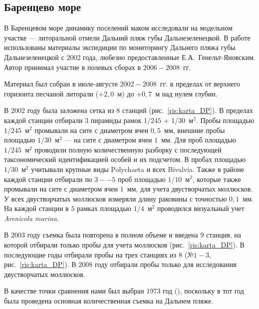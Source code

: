         \subsection{Баренцево море}

В Баренцевом море динамику поселений маком исследовали на модельном участке --- литоральной отмели Дальний пляж губы Дальнезеленецкой. 
В работе использованы материалы экспедиции по мониторингу Дальнего пляжа губы Дальнезеленецкой с $2002$ года, любезно предоставленные Е.\:А.~Генельт-Яновским.
Автор принимал участие в полевых сборах в $2006 - 2008$~гг.

Материал был собран в июле-августе $2002 - 2008$~гг. в пределах от верхнего горизонта песчаной литорали ($+2,0$~м) до $+0,7$~м над нулем глубин. 

 В $2002$ году была заложена сетка из $8$ станций (рис.~\ref{ris:karta_DP}). 
 В пределах каждой станции отбирали $3$ пирамиды рамок $1/245$ + $1/30$~м$^2$. 
 Пробы площадью $1/245$~м$^2$ промывали на сите с диаметром ячеи $0,5$~мм, внешние пробы площадью $1/30$~м$^2$ --- на сите с диаметром ячеи $1$~мм. 
 Для проб площадью $1/245$~м$^2$ проводили полную количественную разборку с последующей таксономический идентификацией особей и их подсчетом. 
 В пробах  площадью $1/30$~м$^2$ учитывали крупные виды Polychaeta и всех Bivalvia. 
 Также в районе каждой станции отбирали по $3--5$ проб площадью $1/10$~м$^2$, которые также промывали на сите с диаметром ячеи $1$~мм, для учета двустворчатых моллюсков.  
 У всех двустворчатых моллюсков измеряли длину раковины с точностью $0,1$~мм. 
 На каждой станции в $5$ рамках площадью $1/4$~м$^2$ проводился визуальный учет {\it Arenicola marina}.

 В $2003$ году съемка была повторена в полном объеме и введена $9$ станция, на которой отбирали только пробы для учета моллюсков (рис.~\ref{ris:karta_DP}). 
 В последующие годы отбирали пробы на трех станциях из $8$ (№$1-3$, рис.~\ref{ris:karta_DP}). 
 В $2008$ году отбирали пробы только для исследования двустворчатых моллюсков.

 В качестве точки сравнения нами был выбран $1973$ год (\cite{Streltsov_et_al_1974, Agarova_et_al_1976}), поскольку в тот год была проведена основная количественная съемка на Дальнем пляже. 




